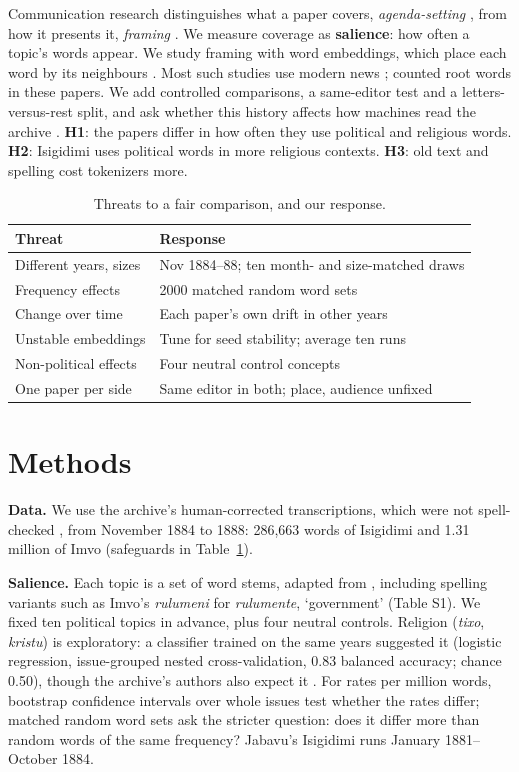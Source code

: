 \documentclass[10pt,letterpaper]{article}
\begin{document}
Communication research distinguishes what a paper covers, \emph{agenda-setting} \citep{mccombs1972}, from how it presents it, \emph{framing} \citep{entman1993}. We measure coverage as \textbf{salience}: how often a topic's words appear. We study framing with word embeddings, which place each word by its neighbours \citep{hamilton2016}. Most such studies use modern news \citep{card2015,field2018}; \citet{schoots2023b} counted root words in these papers. We add controlled comparisons, a same-editor test and a letters-versus-rest split, and ask whether this history affects how machines read the archive \citep{petrov2023,rust2021}. \textbf{H1}: the papers differ in how often they use political and religious words. \textbf{H2}: Isigidimi uses political words in more religious contexts. \textbf{H3}: old text and spelling cost tokenizers more.

\begin{table}[t]
\centering\footnotesize
\begin{tabular}{@{}p{1.18in}p{2.02in}@{}}
\toprule
\textbf{Threat} & \textbf{Response} \\ \midrule
Different years, sizes & Nov 1884--88; ten month- and size-matched draws \\
Frequency effects & 2000 matched random word sets \citep{monroe2008} \\
Change over time & Each paper's own drift in other years \\
Unstable embeddings & Tune for seed stability; average ten runs \\
Non-political effects & Four neutral control concepts \\
One paper per side & Same editor in both; place, audience unfixed \\
\bottomrule
\end{tabular}
\caption{Threats to a fair comparison, and our response.}
\label{tab:design}
\end{table}

\section{Methods}
\textbf{Data.} We use the archive's human-corrected transcriptions, which were not spell-checked \citep[p.~59]{schoots2023}, from November 1884 to 1888: 286{,}663 words of Isigidimi and 1.31 million of Imvo (safeguards in Table~\ref{tab:design}).

\textbf{Salience.} Each topic is a set of word stems, adapted from \citet{schoots2023b}, including spelling variants such as Imvo's \emph{rulumeni} for \emph{rulumente}, `government' (Table S1). We fixed ten political topics in advance, plus four neutral controls. Religion (\emph{tixo}, \emph{kristu}) is exploratory: a classifier trained on the same years suggested it (logistic regression, issue-grouped nested cross-validation, 0.83 balanced accuracy; chance 0.50), though the archive's authors also expect it \citep[p.~57]{schoots2023}. For rates per million words, bootstrap confidence intervals over whole issues test whether the rates differ; matched random word sets ask the stricter question: does it differ more than random words of the same frequency? Jabavu's Isigidimi runs January 1881--October 1884.
\end{document}
